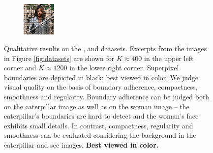 \begin{figure}
	\begin{subfigure}[b]{0.10\textwidth}
		\includegraphics[height=1.65cm]{pictures/fash/seaw/cropped/seaw_010_contours}
	\end{subfigure}
	\caption{Qualitative results on the \BSDS, \SBD and \Fash datasets. Excerpts from the
	images in Figure \ref{fig:datasets} are shown for $K \approx 400$ in the upper left corner
	and $K \approx 1200$ in the lower right corner. Superpixel boundaries are depicted
	in black; best viewed in color. We judge visual quality on the basis of
	boundary adherence, compactness, smoothness and regularity.
	Boundary adherence can be judged both on the caterpillar image as well 
	as on the woman image -- the caterpillar's boundaries are hard to detect and 
	the woman's face exhibits small details. In contrast, compactness, regularity and smoothness 
	can be evaluated considering the background in the caterpillar and see images.
	\textbf{Best viewed in color.}}
	\label{fig:experiments-qualitative-bsds500-sbd-fash}
\end{figure}


